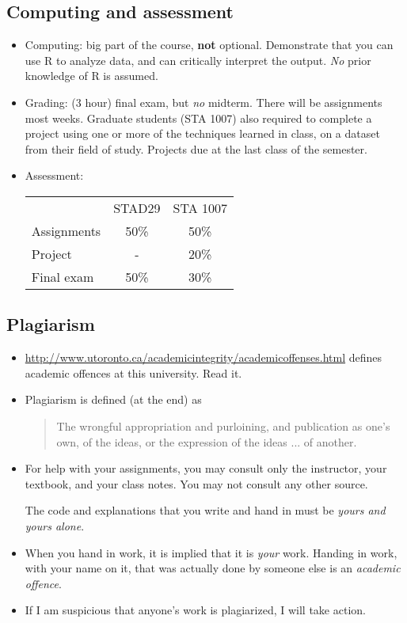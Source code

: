 \documentclass{article}
\begin{document}
\subsection*{Computing and assessment}
\begin{itemize}
\item Computing: big part of the course, {\bf not}
  optional. Demonstrate that you can use 
  R to analyze data, and can
  critically interpret the output. {\em No} prior knowledge of R is assumed.
\item Grading: (3 hour) final exam, but \emph{no} midterm. There will
  be assignments most weeks. 
  Graduate students (STA 1007) also required to
  complete a project using one or more of the techniques learned in
  class, on a dataset from their field of study.    Projects due at the
  last class of the semester.

\item Assessment:

  \begin{tabular}{lcc}
    & STAD29 & STA 1007\\
    Assignments & 50\% & 50\%\\
    Project & - & 20\%\\
    Final exam & 50\% & 30\%
  \end{tabular}

\end{itemize}


\subsection*{Plagiarism}

  \begin{itemize}
  \item
    \url{http://www.utoronto.ca/academicintegrity/academicoffenses.html}
    defines academic offences at this university. Read it.
  \item Plagiarism is defined (at the end) as
    \begin{quote}
       The wrongful appropriation and purloining, and publication as one’s own, of the ideas, or the expression of the ideas ... of another.
    \end{quote}
    \item 
  For help with your assignments, you may consult only the instructor,
 your textbook, and your class
 notes.  You may not consult any other source.

The code and
    explanations  that
    you write and hand in must be \emph{yours and yours
      alone}. 
    \item When you hand in work, it is implied that it is
    \emph{your} work. Handing in work, with your name on it, that was actually done by
    someone else is an \emph{academic offence}.
  \item If I am suspicious
    that anyone's work is plagiarized, I will take action.
    
  \end{itemize}
  
\end{document}
